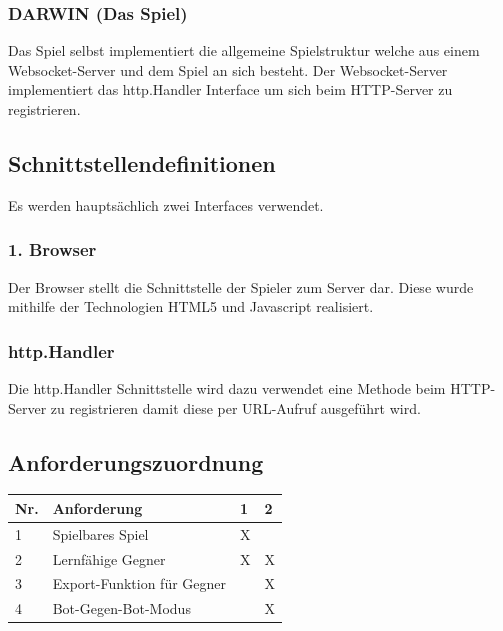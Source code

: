 \subsubsection{DARWIN (Das Spiel)}
Das Spiel selbst implementiert die allgemeine Spielstruktur welche aus einem Websocket-Server und dem Spiel an sich besteht. Der Websocket-Server implementiert das http.Handler Interface um sich beim HTTP-Server zu registrieren.
\subsection{Schnittstellendefinitionen}
Es werden hauptsächlich zwei Interfaces verwendet.
\subsubsection{1. Browser}
Der Browser stellt die Schnittstelle der Spieler zum Server dar. Diese wurde
mithilfe der Technologien HTML5 und Javascript realisiert.
\subsubsection{http.Handler}
Die http.Handler Schnittstelle wird dazu verwendet eine Methode beim HTTP-Server zu registrieren damit diese per URL-Aufruf ausgeführt wird.
\subsection{Anforderungszuordnung}
\begin{tabularx}{\textwidth}{|p{0.7cm}|p{7.0cm}|X|X|}
\hline
Nr. & Anforderung & 1 & 2 \\
\hline
1 & Spielbares Spiel & X & \\
\hline
2 & Lernfähige Gegner & X & X  \\
\hline
3 & Export-Funktion für Gegner & & X  \\
\hline
4 & Bot-Gegen-Bot-Modus & & X    \\
\hline
\end{tabularx}
